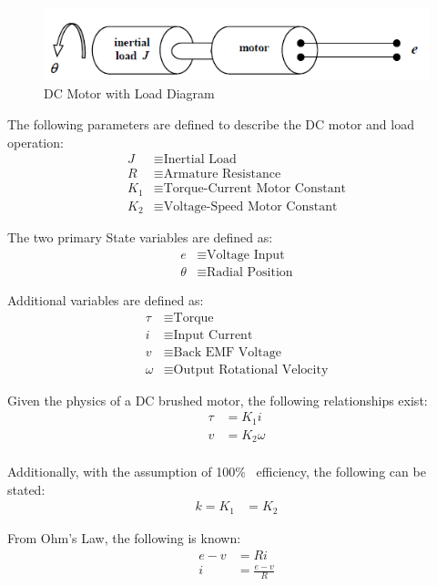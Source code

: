 \documentclass[]{article}
\begin{document}
		\begin{figure}[h]
			\centering
			\includegraphics[width=0.7\linewidth]{Fig/DesignApplication1}
			\caption{DC Motor with Load Diagram}
			\label{fig:designapplication1}
		\end{figure}
		
		The following parameters are defined to describe the DC motor and load operation:
		\begin{align*}
			J &\equiv \text{Inertial Load}\\
			R &\equiv \text{Armature Resistance}\\
			K_1 &\equiv \text{Torque-Current Motor Constant}\\
			K_2 &\equiv \text{Voltage-Speed Motor Constant}
		\end{align*}
		
		The two primary State variables are defined as:
		\begin{align*}
			e &\equiv \text{Voltage Input}\\
			\theta &\equiv \text{Radial Position}
		\end{align*}
		
		Additional variables are defined as:
		\begin{align*}
			\tau 	&\equiv \text{Torque}\\
			i		&\equiv \text{Input Current}\\
			v 		&\equiv \text{Back EMF Voltage}\\
			\omega	&\equiv \text{Output Rotational Velocity}
		\end{align*}
		
		Given the physics of a DC brushed motor, the following relationships exist:
		\begin{align}
			\tau &= K_1 i \label{eq:tau_i_rel}\\
			v &= K_2 \omega \label{eq:v_omega_rel}\\
		\end{align}
		
		Additionally, with the assumption of 100\% \ efficiency, the following can be stated:
		\begin{align}
			k = K_1 &= K_2 \label{eq:K1_K2}
		\end{align}
		
		From Ohm's Law, the following is known:
		\begin{align}
			e - v &= Ri \nonumber\\
			i &= \frac{e-v}{R} \label{eq:armature_Ohms}
		\end{align}
		
\end{document}
